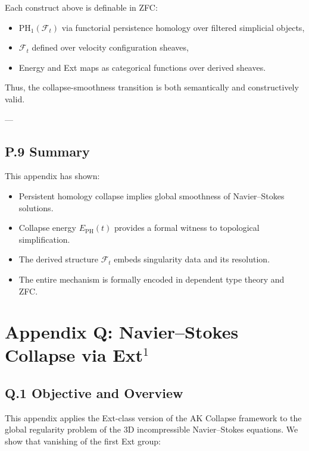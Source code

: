 \documentclass[11pt]{article}
\begin{document}
Each construct above is definable in ZFC:
\begin{itemize}
  \item $\mathrm{PH}_1(\mathcal{F}_t)$ via functorial persistence homology over filtered simplicial objects,
  \item $\mathcal{F}_t$ defined over velocity configuration sheaves,
  \item Energy and Ext maps as categorical functions over derived sheaves.
\end{itemize}

Thus, the collapse-smoothness transition is both semantically and constructively valid.

---

\subsection*{P.9 Summary}

This appendix has shown:
\begin{itemize}
  \item Persistent homology collapse implies global smoothness of Navier–Stokes solutions.
  \item Collapse energy $E_{\mathrm{PH}}(t)$ provides a formal witness to topological simplification.
  \item The derived structure $\mathcal{F}_t$ embeds singularity data and its resolution.
  \item The entire mechanism is formally encoded in dependent type theory and ZFC.
\end{itemize}




\section*{Appendix Q: Navier–Stokes Collapse via Ext$^1$}

\subsection*{Q.1 Objective and Overview}

This appendix applies the Ext-class version of the AK Collapse framework to the global regularity problem of the 3D incompressible Navier–Stokes equations.  
We show that vanishing of the first Ext group:
\end{document}
